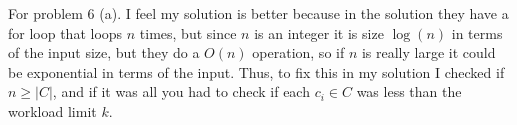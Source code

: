 \documentclass[12pt, letterpaper]{article}
\begin{document}
\color{\TextColor}
\pagecolor{\colormode}
\setlength{\parindent}{0pt}
\pagestyle{fancy}
\fancyhf{}
\fancyhead[ROE]{\color{\TextColor}\thepage}

\begin{solution}
    For problem 6 (a). I feel my solution is better because in the solution they have a for loop that loops $n$ times, but since $n$ is an integer it is size $\log(n)$ in terms of the input size, but they do a $O(n)$ operation, so if $n$ is really large it could be exponential in terms of the input. Thus, to fix this in my solution I checked if $n \geq |C|$, and if it was all you had to check if each $c_i \in C$ was less than the workload limit $k$.
\end{solution}
\end{document}
